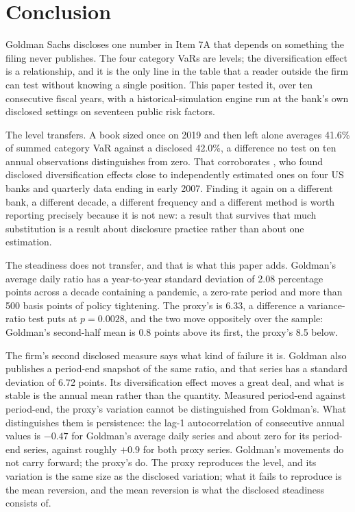 
\section{Conclusion}\label{sec:conclusion}

Goldman Sachs discloses one number in Item 7A that depends on something the
filing never publishes. The four category VaRs are levels; the diversification
effect is a relationship, and it is the only line in the table that a reader
outside the firm can test without knowing a single position. This paper tested
it, over ten consecutive fiscal years, with a historical-simulation engine run
at the bank's own disclosed settings on seventeen public risk factors.

The level transfers. A book sized once on 2019 and then left alone averages
41.6\% of summed category VaR against a disclosed 42.0\%, a difference no test
on ten annual observations distinguishes from zero. That corroborates
\citet{perignon2010diversification}, who found disclosed diversification
effects close to independently estimated ones on four US banks and quarterly
data ending in early 2007. Finding it again on a different bank, a different
decade, a different frequency and a different method is worth reporting
precisely because it is not new: a result that survives that much substitution
is a result about disclosure practice rather than about one estimation.

The steadiness does not transfer, and that is what this paper adds. Goldman's
average daily ratio has a year-to-year standard deviation of 2.08 percentage
points across a decade containing a pandemic, a zero-rate period and more than
500 basis points of policy tightening. The proxy's is 6.33, a difference a
variance-ratio test puts at $p = 0.0028$, and the two move oppositely over the
sample: Goldman's second-half mean is 0.8 points above its first, the proxy's
8.5 below.

The firm's second disclosed measure says what kind of failure it is. Goldman
also publishes a period-end snapshot of the same ratio, and that series has a
standard deviation of 6.72 points. Its diversification effect moves a great
deal, and what is stable is the annual mean rather than the quantity. Measured
period-end against period-end, the proxy's variation cannot be distinguished
from Goldman's. What distinguishes them is persistence: the lag-1
autocorrelation of consecutive annual values is $-0.47$ for Goldman's average
daily series and about zero for its period-end series, against roughly $+0.9$
for both proxy series. Goldman's movements do not carry forward; the proxy's
do. The proxy reproduces the level, and its variation is the same size as the
disclosed variation; what it fails to reproduce is the mean reversion, and the
mean reversion is what the disclosed steadiness consists of.

